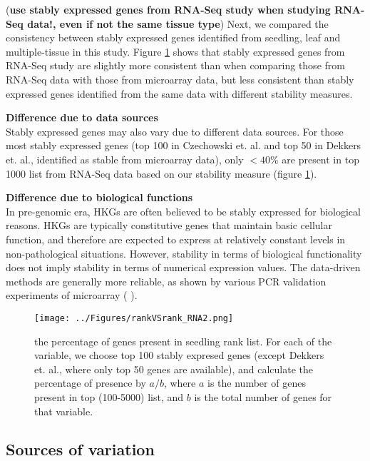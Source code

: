 \documentclass[11pt, a4paper]{article}
\begin{document}
(\textbf{use stably expressed genes from RNA-Seq study when studying RNA-Seq data!, even if not the same tissue type}) 
Next, we compared the consistency between stably expressed genes identified from seedling, leaf and multiple-tissue in this study. Figure \ref{fig:rankVSrank_RNA} shows that stably expressed genes from RNA-Seq study are slightly more consistent than when comparing those from RNA-Seq data with those from microarray data, but less consistent than stably expressed genes identified from the same data with different stability measures.

\textbf{Difference due to data sources}\\
Stably expressed genes may also vary due to different data sources. For those most stably expressed genes (top 100 in Czechowski et. al. and top 50 in  Dekkers et. al., identified as stable from microarray data), only $< 40\%$ are present in top 1000 list from RNA-Seq data based on our stability measure (figure \ref{fig:rankVSrank_RNA}).

\textbf{Difference due to biological functions}\\
 In pre-genomic era, HKGs are often believed to be stably expressed for biological reasons. HKGs are typically constitutive genes that maintain basic cellular function, and therefore are expected to express at relatively constant levels in non-pathological situations. However, stability in terms of biological functionality does not imply stability in terms of numerical expression values.  The data-driven methods are generally more reliable, as shown by various PCR validation experiments of microarray (\cite{czechowski2005genome} \cite{hruz2011refgenes}).



 \begin{figure}[h!]
 	\begin{center}
 		\texttt{[image: ../Figures/rankVSrank\_RNA2.png]}
 		\caption{ the percentage of genes present in seedling rank list. For each of the variable, we choose top 100 stably expresed genes (except Dekkers et. al., where only top 50 genes are available), and calculate the percentage of presence by $a/b$, where $a$ is the number of genes present in top (100-5000) list, and $b$ is the total number of genes for that variable.}
	 	\label{fig:rankVSrank_RNA}
	 	\end{center}
 \end{figure}

  \subsection{Sources of variation}\label{Section:varianceComp}
\end{document}

